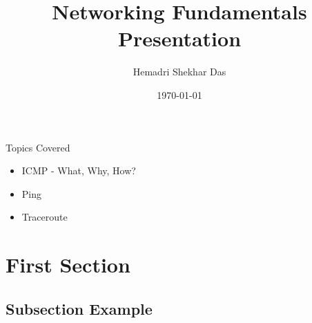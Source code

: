 \documentclass[aspectratio=169]{beamer}
\title[ITMO LaTex]{\textbf{Networking Fundamentals Presentation}}
\author[LastName F.]{Hemadri Shekhar Das}
\institute[short institute]{Chennai Mathematical Institute}
\date{\today}
\begin{document}


\begin{frame}[plain]
    \titlepage
\end{frame}



\begin{frame}[plain]
\end{frame}





\begin{frame}{Topics Covered}

\begin{itemize}
    \item ICMP - What, Why, How?
    \item Ping 
    \item Traceroute 
\end{itemize}

\end{frame}



\section{First Section}

\subsection{Subsection Example} 
\end{document}
